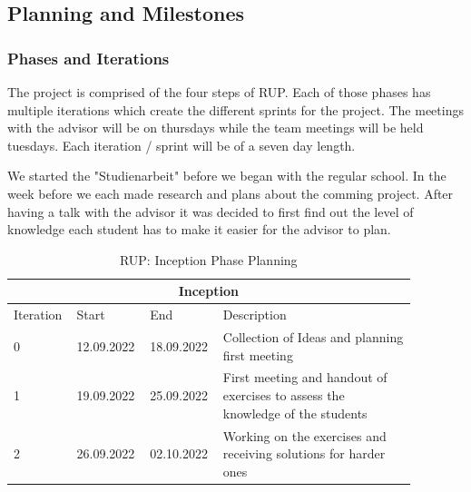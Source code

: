\subsection{Planning and Milestones}

\subsubsection*{Phases and Iterations}
The project is comprised of the four steps of RUP. Each of those phases has multiple iterations which create the different sprints for the project. The meetings with the advisor will be on thursdays while the team meetings will be held tuesdays. Each iteration / sprint will be of a seven day length.

\noindent We started the "Studienarbeit" before we began with the regular school. In the week before we each made research and plans about the comming project. After having a talk with the advisor it was decided to first find out the level of knowledge each student has to make it easier for the advisor to plan.
\begin{table}[H]
    \centering
    \begin{tabular}{|p{0.12\linewidth}|p{0.15\linewidth}|p{0.15\linewidth}|p{0.46\linewidth}|}
        \hline
        \multicolumn{4}{||c||}{\textbf{Inception}} \\
        \hline \hline
        Iteration & Start & End & Description \\
        \hline \hline
        0 & 12.09.2022 & 18.09.2022 & Collection of Ideas and planning first meeting\\
        \hline
        1 & 19.09.2022 & 25.09.2022 & First meeting and handout of exercises to assess the knowledge of the students \\
        \hline
        2 & 26.09.2022 & 02.10.2022 & Working on the exercises and receiving solutions for harder ones \\
        \hline
    \end{tabular}
    \caption{RUP: Inception Phase Planning}
    \label{inception_table}
\end{table}

